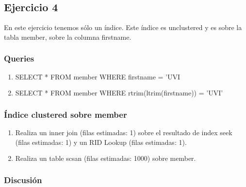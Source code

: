 
\subsection{Ejercicio 4}

En este ejercicio tenemos sólo un índice. Este índice es unclustered y es sobre la tabla member, sobre la columna firstname.

\subsubsection{Queries}

\begin{enumerate}[label=(\alph*)]
\item SELECT * FROM member WHERE firstname = ’UVI
\item SELECT * FROM member WHERE rtrim(ltrim(firstname)) = ’UVI’
\end{enumerate}

\subsubsection{Índice clustered sobre member}
\begin{enumerate}[label=(\alph*)]
\item Realiza un inner join (filas estimadas: 1) sobre el resultado de index seek (filas estimadas: 1) y un RID Lookup (filas estimadas: 1).
\item Realiza un table scsan (filas estimadas: 1000) sobre member.
\end{enumerate}

\subsubsection{Discusión}

